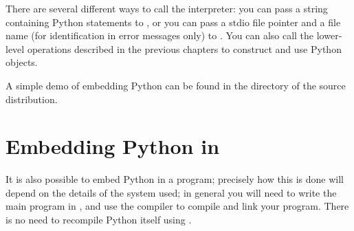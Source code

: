 \documentclass{manual}
\begin{document}
There are several different ways to call the interpreter: you can pass
a string containing Python statements to
, or you can pass a stdio file pointer
and a file name (for identification in error messages only) to
.  You can also call the lower-level
operations described in the previous chapters to construct and use
Python objects.

A simple demo of embedding Python can be found in the directory
 of the source distribution.


\section{Embedding Python in \Cpp{}
         \label{embeddingInCplusplus}}

It is also possible to embed Python in a \Cpp{} program; precisely how this
is done will depend on the details of the \Cpp{} system used; in general you
will need to write the main program in \Cpp{}, and use the \Cpp{} compiler
to compile and link your program.  There is no need to recompile Python
itself using \Cpp{}.
\end{document}
